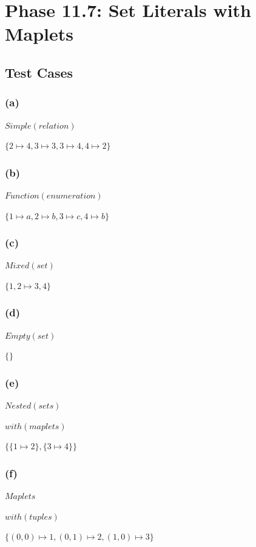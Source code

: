 \documentclass[a4paper,10pt,fleqn]{article}
\begin{document}
\section*{Phase 11.7: Set Literals with Maplets}

\subsection*{Test Cases}

\subsubsection*{(a)}

\noindent
$Simple(relation)$


\noindent
$\{2 \mapsto 4, 3 \mapsto 3, 3 \mapsto 4, 4 \mapsto 2\}$


\medskip

\subsubsection*{(b)}

\noindent
$Function(enumeration)$


\noindent
$\{1 \mapsto a, 2 \mapsto b, 3 \mapsto c, 4 \mapsto b\}$


\medskip

\subsubsection*{(c)}

\noindent
$Mixed(set)$


\noindent
$\{1, 2 \mapsto 3, 4\}$


\medskip

\subsubsection*{(d)}

\noindent
$Empty(set)$


\noindent
$\{\}$


\medskip

\subsubsection*{(e)}

\noindent
$Nested(sets)$


\noindent
$with(maplets)$


\noindent
$\{\{1 \mapsto 2\}, \{3 \mapsto 4\}\}$


\medskip

\subsubsection*{(f)}

\noindent
$Maplets$


\noindent
$with(tuples)$


\noindent
$\{(0, 0) \mapsto 1, (0, 1) \mapsto 2, (1, 0) \mapsto 3\}$
\end{document}
